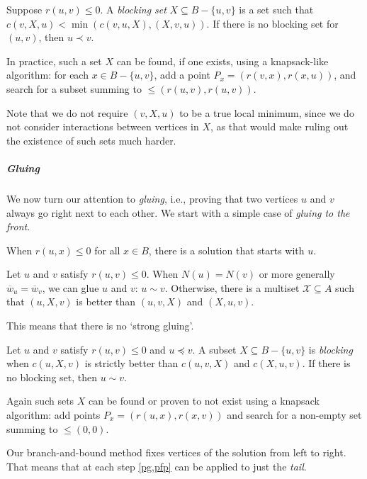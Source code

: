 \documentclass[a4paper,UKenglish,cleveref, autoref, thm-restate]{lipics-v2021}
\renewcommand{\b}{\prec}
\newcommand{\be}{\preceq}
\newcommand{\g}{\sim}
\newcommand{\w}{\overline{w}}
\begin{document}
\begin{lemma}\label{pfp}
  Suppose $r(u,v)\leq 0$.
    A \emph{blocking set} $X\subseteq B-\{u,v\}$ is a set such that $c(v,X,u) < \min(c(v, u,
    X), (X, v, u))$.  If there is no blocking set for $(u, v)$, then $u\b v$.
\end{lemma}

In practice, such a set $X$ can be found, if one exists, using a knapsack-like algorithm: for
each $x\in B-\{u,v\}$, add a point $P_x = (r(v, x), r(x, u))$, and search for a subset summing
to ${\leq{}(r(u, v), r(u, v))}$.

Note that we do not require $(v, X, u)$ to be a true local minimum, since we do
not consider interactions between vertices in $X$, as that would make ruling out the
existence of such sets much harder.

\subparagraph{Gluing}
We now turn our attention to \emph{gluing}, i.e., proving that two vertices $u$
and $v$ always go right next to each other. We start with a simple case of
\emph{gluing to the front}.

\begin{lemma}[Greedy]\label{greedy}
  When $r(u, x)\leq 0$ for all $x\in B$, there is a solution that
  starts with $u$.
\end{lemma}

\begin{remark}
  Let $u$ and $v$ satisfy $r(u,v) \leq 0$.
  When $N(u)=N(v)$ or more generally $\w_u=\w_v$, we can glue $u$ and $v$: $u\g v$.
  Otherwise, there is a multiset $\mathcal X\subseteq A$ such that $(u, X, v)$ is
  better than $(u,v,X)$ and $(X,u,v)$.
\end{remark}
This means that there is no `strong gluing'.
\begin{lemma}\label{pg}
  Let $u$ and $v$ satisfy $r(u,v)\leq 0$ and $u\be v$.
  A subset $X\subseteq B-\{u,v\}$ is \emph{blocking} when $c(u, X, v)$ is strictly
  better than $c(u,v,X)$ and $c(X,u,v)$.
  If there is no blocking set, then $u \g v$.
\end{lemma}
Again such sets $X$ can be found or proven to not exist using a knapsack
algorithm: add points $P_x = (r(u, x), r(x, v))$ and search for a non-empty
set summing to $\leq{}(0,0)$.

\begin{remark}
  Our branch-and-bound method fixes vertices of the
solution from left to right. That means that at each step \cref{pg,pfp} can be applied to
just the \emph{tail}.
\end{remark}
\end{document}
